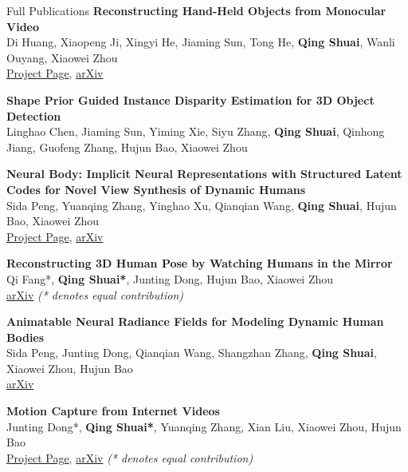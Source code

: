 \begin{rSection}{Full Publications}
    {\bf Reconstructing Hand-Held Objects from Monocular Video}\hfill{ } \\
    Di Huang, Xiaopeng Ji, Xingyi He, Jiaming Sun, Tong He, \textbf{Qing Shuai}, Wanli Ouyang, Xiaowei Zhou\\
    \href{https://dihuangdh.github.io/hhor/}{Project Page}, \href{https://arxiv.org/abs/2211.16835}{arXiv}

    {\bf Shape Prior Guided Instance Disparity Estimation for 3D Object Detection}\hfill{ } \\
    Linghao Chen, Jiaming Sun, Yiming Xie, Siyu Zhang, \textbf{Qing Shuai}, Qinhong Jiang, Guofeng Zhang, Hujun Bao, Xiaowei Zhou

    {\bf Neural Body: Implicit Neural Representations with Structured Latent Codes for Novel View Synthesis of Dynamic Humans}\hfill{ } \\
    Sida Peng, Yuanqing Zhang, Yinghao Xu, Qianqian Wang, \textbf{Qing Shuai}, Hujun Bao, Xiaowei Zhou\\
    \href{https://zju3dv.github.io/neuralbody/}{Project Page}, \href{https://arxiv.org/abs/2012.15838}{arXiv}

    {\bf Reconstructing 3D Human Pose by Watching Humans in the Mirror}\hfill{ } \\
    Qi Fang*, \textbf{Qing Shuai*}, Junting Dong, Hujun Bao, Xiaowei Zhou\\
    \href{https://arxiv.org/abs/2104.00340}{arXiv} {\em (* denotes equal contribution)}

    {\bf Animatable Neural Radiance Fields for Modeling Dynamic Human Bodies}\hfill{ } \\
    Sida Peng, Junting Dong, Qianqian Wang, Shangzhan Zhang, \textbf{Qing Shuai}, Xiaowei Zhou, Hujun Bao\\
    \href{https://arxiv.org/abs/2105.02872}{arXiv}

    {\bf Motion Capture from Internet Videos}\hfill{ } \\
    Junting Dong*, \textbf{Qing Shuai*}, Yuanqing Zhang, Xian Liu, Xiaowei Zhou, Hujun Bao\\
    \href{https://zju3dv.github.io/iMoCap/}{Project Page}, \href{https://arxiv.org/abs/2008.07931}{arXiv} {\em (* denotes equal contribution)}

\end{rSection}

